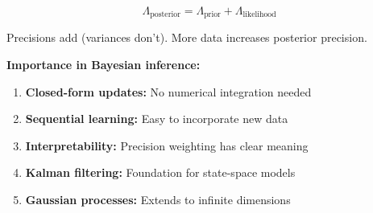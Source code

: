 \documentclass[12pt]{article}
\begin{document}
\begin{solution}
\[
\Lambda_{\text{posterior}} = \Lambda_{\text{prior}} + \Lambda_{\text{likelihood}}
\]

Precisions add (variances don't). More data increases posterior precision.

\textbf{Importance in Bayesian inference:}

\begin{enumerate}
    \item \textbf{Closed-form updates:} No numerical integration needed
    \item \textbf{Sequential learning:} Easy to incorporate new data
    \item \textbf{Interpretability:} Precision weighting has clear meaning
    \item \textbf{Kalman filtering:} Foundation for state-space models
    \item \textbf{Gaussian processes:} Extends to infinite dimensions
\end{enumerate}

\end{solution}
\end{document}
